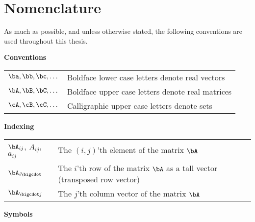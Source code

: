 \chapter*{Nomenclature}

As much as possible, and unless otherwise stated, the following conventions are used throughout this thesis.

\noindent\textbf{Conventions}

\begin{longtable}{p{}p{}}
  $\ba,\bb,\bc,\dots$  & Boldface lower case letters denote real vectors \\
  $\bA,\bB,\bC,\dots$  & Boldface upper case letters denote real matrices \\
  $\cA,\cB,\cC,\dots$  & Calligraphic upper case letters denote sets \\
\end{longtable}

\noindent\textbf{Indexing}

\begin{longtable}{p{}p{}}
  $\bA_{ij}$, $A_{ij}$, $a_{ij}$   & The $(i,j)$'th element of the matrix $\bA$ \\
  $\bA_{i\bigcdot}$  & The $i$'th row of the matrix $\bA$ as a tall vector (transposed row vector)  \\
  $\bA_{\bigcdot j}$  & The $j$'th column vector of the matrix $\bA$ \\
\end{longtable}

\noindent\textbf{Symbols}

